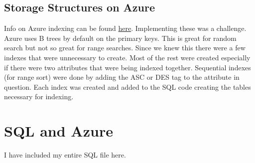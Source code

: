 \documentclass[11pt]{article}
\begin{document}
\subsection{Storage Structures on Azure}
Info on Azure indexing can be found \href{https://learn.microsoft.com/en-us/sql/relational-databases/indexes/indexes?view=sql-server-ver16}{here}.  Implementing these was a challenge.  Azure uses B trees by default on the primary keys.  This is great for random search but not so great for range searches.  Since we knew this there were a few indexes that were unnecessary to create.  Most of the rest were created especially if there were two attributes that were being indexed together.  Sequential indexes (for range sort) were done by adding the ASC or DES tag to the attribute in question.  Each index was created and added to the SQL code creating the tables necessary for indexing.

\section{SQL and Azure}

I have included my entire SQL file here.

\end{document}
